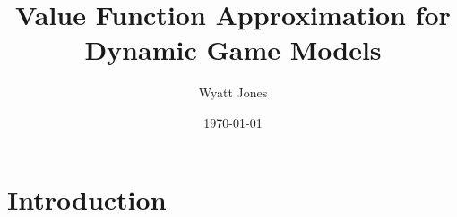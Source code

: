 \documentclass[12pt]{article}
\title{Value Function Approximation for Dynamic Game Models}
\author{Wyatt Jones}
\date{\today}
\begin{document}
\maketitle


\section{Introduction}
\label{intro}



\end{document}
